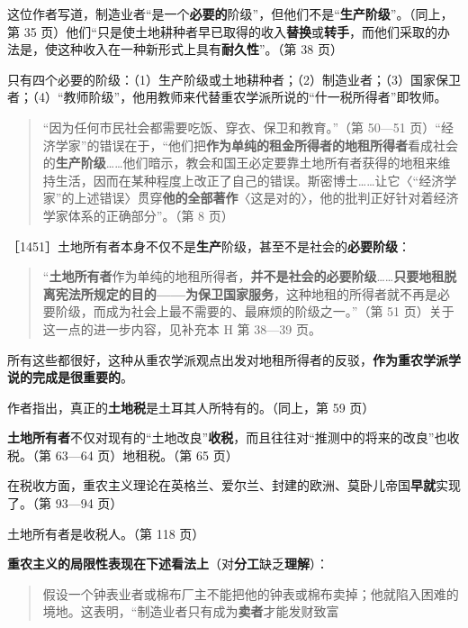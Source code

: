 这位作者写道，制造业者“是一个\textbf{必要的}阶级”，但他们不是“\textbf{生产阶级}”。（同上，第 35 页）他们“只是使土地耕种者早已取得的收入\textbf{替换}或\textbf{转手}，而他们采取的办法是，使这种收入在一种新形式上具有\textbf{耐久性}”。（第 38 页）

只有四个必要的阶级：（1）生产阶级或土地耕种者；（2）制造业者；（3）国家保卫者；（4）“教师阶级”，他用教师来代替重农学派所说的“什一税所得者”即牧师。

\begin{quote}“因为任何市民社会都需要吃饭、穿衣、保卫和教育。”（第 50—51 页）“经济学家”的错误在于，“他们把\textbf{作为单纯的租金所得者的地租所得者}看成社会的\textbf{生产阶级}……他们暗示，教会和国王必定要靠土地所有者获得的地租来维持生活，因而在某种程度上改正了自己的错误。斯密博士……让它〈“经济学家”的上述错误〉贯穿\textbf{他的全部著作}〈这是对的〉，他的批判正好针对着经济学家体系的正确部分”。（第 8 页）\end{quote}

［1451］土地所有者本身不仅不是\textbf{生产}阶级，甚至不是社会的\textbf{必要阶级}：

\begin{quote}“\textbf{土地所有者}作为单纯的地租所得者，\textbf{并不是社会的必要阶级}……\textbf{只要地租脱离宪法所规定的目的——为保卫国家服务}，这种地租的所得者就不再是必要阶级，而成为社会上最不需要的、最麻烦的阶级之一。”（第 51 页）关于这一点的进一步内容，见补充本 H 第 38—39 页。\end{quote}

所有这些都很好，这种从重农学派观点出发对地租所得者的反驳，\textbf{作为重农学派学说的完成是很重要的}。

作者指出，真正的\textbf{土地税}是土耳其人所特有的。（同上，第 59 页）

\textbf{土地所有者}不仅对现有的“土地改良”\textbf{收税}，而且往往对“推测中的将来的改良”也收税。（第 63—64 页）地租税。（第 65 页）

在税收方面，重农主义理论在英格兰、爱尔兰、封建的欧洲、莫卧儿帝国\textbf{早就}实现了。（第 93—94 页）

土地所有者是收税人。（第 118 页）

\textbf{重农主义的局限性表现在下述看法上}（对\textbf{分工}缺乏\textbf{理解}）：

\begin{quote}假设一个钟表业者或棉布厂主不能把他的钟表或棉布卖掉；他就陷入困难的境地。这表明，“制造业者只有成为\textbf{卖者}才能发财致富\end{quote}

